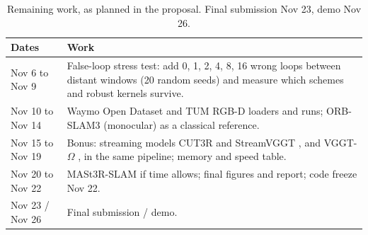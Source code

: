 \documentclass[11pt, a4paper]{article}
\begin{document}
\begin{table}[H]
\centering
\caption{Remaining work, as planned in the proposal. Final submission Nov 23, demo Nov 26.}
\label{tab:plan}
\small
\begin{tabularx}{\textwidth}{>{\raggedright\arraybackslash}p{3.1cm} X}
\toprule
Dates & Work \\
\midrule
Nov 6 to Nov 9 & False-loop stress test: add 0, 1, 2, 4, 8, 16 wrong loops between distant windows (20 random seeds) and
measure which schemes and robust kernels survive. \\
Nov 10 to Nov 14 & Waymo Open Dataset \cite{waymo} and TUM RGB-D \cite{tum} loaders and runs; ORB-SLAM3 (monocular)
\cite{orbslam3} as a classical reference. \\
Nov 15 to Nov 19 & Bonus: streaming models CUT3R \cite{cut3r} and StreamVGGT \cite{streamvggt}, and VGGT-$\Omega$
\cite{vggtomega}, in the same pipeline; memory and speed table. \\
Nov 20 to Nov 22 & MASt3R-SLAM \cite{mast3rslam} if time allows; final figures and report; code freeze Nov 22. \\
Nov 23 / Nov 26 & Final submission / demo. \\
\bottomrule
\end{tabularx}
\end{table}
\end{document}
